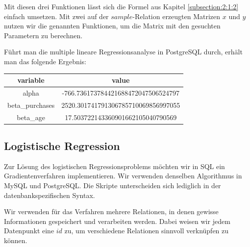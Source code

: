 Mit diesen drei Funktionen lässt sich die Formel aus Kapitel \ref{subsection:2:1:2} einfach umsetzen. Mit zwei auf der $sample$-Relation erzeugten Matrizen $x$ und $y$ nutzen wir die genannten Funktionen, um die Matrix mit den gesuchten Parametern zu berechnen.

Führt man die multiple lineare Regressionsanalyse in PostgreSQL durch, erhält man das folgende Ergebnis:

\begin{center}
  \begin{tabular}{|c|c|}\hline
    \textbf{variable} & \textbf{value} \\ \hline
    alpha & -766.736173784421688472047506524797 \\ \hline
    beta\_purchases & 2520.301741791306785710069856997055 \\ \hline
    beta\_age & 17.503722143360901662105040790569 \\ \hline
  \end{tabular}
\end{center}

\subsection{Logistische Regression}
\label{subsection:3:4:3}

Zur Lösung des logistischen Regressionsproblems möchten wir in SQL ein Gradientenverfahren implementieren. Wir verwenden denselben Algorithmus in MySQL und PostgreSQL. Die Skripte unterscheiden sich lediglich in der datenbankspezifischen Syntax.

Wir verwenden für das Verfahren mehrere Relationen, in denen gewisse Informationen gespeichert und verarbeiten werden. Dabei weisen wir jedem Datenpunkt eine $id$ zu, um verschiedene Relationen sinnvoll verknüpfen zu können.

